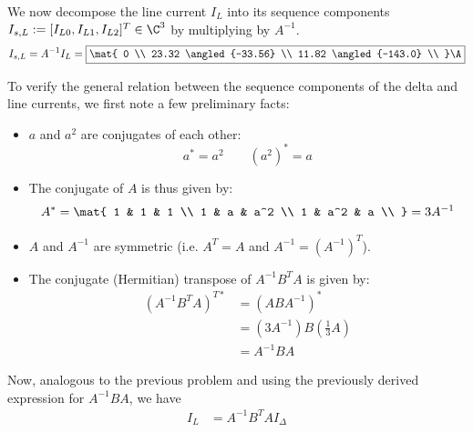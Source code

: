 \documentclass{homework}
\begin{document}
\begin{letterenum}
    \item We now decompose the line current $I_L$ into its sequence
        components $I_{s, L} := [I_{L0}, I_{L1}, I_{L2}]^T \in \C^3$
        by multiplying by $A^{-1}$.
        \begin{equation}
            I_{s,L} = A^{-1} I_L = \boxed{\mat{
                0 \\
                23.32 \angled{-33.56} \\
                11.82 \angled{-143.0} \\
            } \A}
        \end{equation}

        To verify the general relation between the sequence components of
        the delta and line currents, we first note a few preliminary facts:
        \begin{itemize}
            \item $a$ and $a^2$ are conjugates of each other:
                \begin{equation}
                    a^* = a^2 \qquad (a^2)^* = a
                \end{equation}
            \item The conjugate of $A$ is thus given by:
            \begin{equation}
                A^* = \mat{
                    1 & 1 & 1 \\
                    1 & a & a^2 \\
                    1 & a^2 & a \\
                } = 3A^{-1}
            \end{equation}
            \item $A$ and $A^{-1}$ are symmetric (i.e. $A^T = A$ and $A^{-1} = (A^{-1})^T$).
            \item The conjugate (Hermitian) transpose of $A^{-1}B^TA$ is given by:
            \begin{align*}
                (A^{-1}B^TA)^{T*} &= (ABA^{-1})^* \\
                    &= (3A^{-1})B(\frac{1}{3}A) \\
                    &= A^{-1}BA 
            \end{align*}
        \end{itemize}
        Now, analogous to the previous problem and using the previously derived
        expression for $A^{-1}BA$, we have
        \begin{align*}
            I_L &= A^{-1}B^TA I_\Delta  \\

\end{align*}
\end{letterenum}
\end{document}
